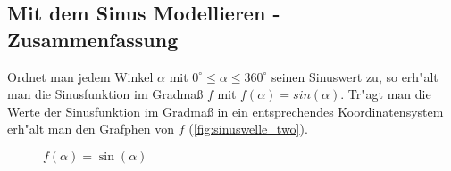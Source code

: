 \documentclass{standalone}
\begin{document}
\subsection{Mit dem Sinus Modellieren - Zusammenfassung}
Ordnet man jedem Winkel $\alpha$ mit $0^\circ \leq \alpha \leq 360^\circ$  seinen Sinuswert zu, so erh{"a}lt man die Sinusfunktion im Gradma{\ss} $f$ mit $f(\alpha) = sin(\alpha)$. Tr{"a}gt man die Werte der Sinusfunktion im Gradma{\ss} in ein entsprechendes Koordinatensystem erh{"a}lt man den Grafphen von $f$ (\autoref{fig:sinuswelle_two}).

\begin{figure}[hb!]
  \center
  \def\svgwidth{450px}
  
  \caption{$f(\alpha) = \sin(\alpha)$}
  \label{fig:sinuswelle_two}
\end{figure}
\end{document}
